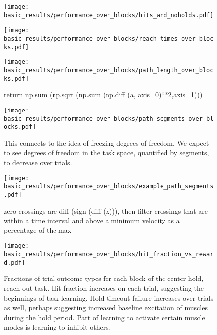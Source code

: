 \documentclass[../main.tex]{subfiles}
\begin{document}
\begin{figure}[H]
    \centering
    \texttt{[image: basic\_results/performance\_over\_blocks/hits\_and\_noholds.pdf]}
    \caption[Hit counts over trials]{}\label{fig:hits_and_noholds}
\end{figure}


\begin{figure}[H]
    \centering
    \texttt{[image: basic\_results/performance\_over\_blocks/reach\_times\_over\_blocks.pdf]}
    \caption[Reach time over trials]{}\label{fig:reach_times_over_blocks}
\end{figure}


\begin{figure}[H]
    \centering
    \texttt{[image: basic\_results/performance\_over\_blocks/path\_length\_over\_blocks.pdf]}
    \caption[Trajectory length over trials]{return np.sum (np.sqrt (np.sum (np.diff (a, axis=0)**2,axis=1)))}\label{fig:path_length_over_blocks}
\end{figure}


\begin{figure}[H]
    \centering
    \texttt{[image: basic\_results/performance\_over\_blocks/path\_segments\_over\_blocks.pdf]}
    \caption[Trajectory segments over trials]{This connects to the idea of freezing degrees of freedom. We expect to see degrees of freedom in the task space, quantified by segments, to decrease over trials.}\label{fig:path_segments_over_blocks}
\end{figure}


\begin{figure}[H]
    \centering
    \texttt{[image: basic\_results/performance\_over\_blocks/example\_path\_segments.pdf]}
    \caption[Trajectory segment definition]{zero crossings are diff (sign (diff (x))), then filter crossings that are within a time interval and above a minimum velocity as a percentage of the max}\label{fig:segments}
\end{figure}


\begin{figure}[H]
    \centering
    \texttt{[image: basic\_results/performance\_over\_blocks/hit\_fraction\_vs\_reward.pdf]}
    \caption[Hits versus reward]{Fractions of trial outcome types for each block of the center-hold, reach-out task. Hit fraction increases on each trial, suggesting the beginnings of task learning. Hold timeout failure increases over trials as well, perhaps suggesting increased baseline excitation of muscles during the hold period. Part of learning to activate certain muscle modes is learning to inhibit others.}\label{fig:hit_fraction_vs_reward}
\end{figure}
\end{document}
